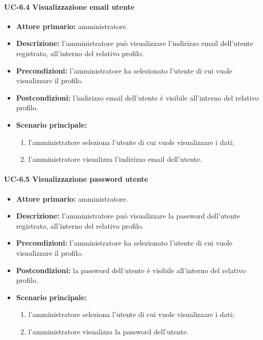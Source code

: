     \paragraph{UC-6.4 Visualizzazione email utente}
    \begin{itemize}
        \item \textbf{Attore primario:} amministratore.
        
        \item \textbf{Descrizione:} l'amministratore può visualizzare l'indirizzo email dell'utente registrato, all'interno del relativo profilo.
        
        \item \textbf{Precondizioni:} l'amministratore ha selezionato l'utente di cui vuole visualizzare il profilo.
    
        \item \textbf{Postcondizioni:} l'indirizzo email dell'utente è visibile all'interno del relativo profilo.
    
        \item \textbf{Scenario principale:}
        \begin{enumerate}
            \item  l'amministratore seleziona l'utente di cui vuole visualizzare i dati;
            \item  l'amministratore visualizza l'indirizzo email dell'utente.
        \end{enumerate}
    \end{itemize}

    \paragraph{UC-6.5 Visualizzazione password utente}
    \begin{itemize}
        \item \textbf{Attore primario:} amministratore.
        
        \item \textbf{Descrizione:} l'amministratore può visualizzare la password dell'utente registrato, all'interno del relativo profilo.
        
        \item \textbf{Precondizioni:} l'amministratore ha selezionato l'utente di cui vuole visualizzare il profilo.
    
        \item \textbf{Postcondizioni:} la password dell'utente è visibile all'interno del relativo profilo.
    
        \item \textbf{Scenario principale:}
        \begin{enumerate}
            \item  l'amministratore seleziona l'utente di cui vuole visualizzare i dati;
            \item  l'amministratore visualizza la password dell'utente.
        \end{enumerate}
    \end{itemize}
    

